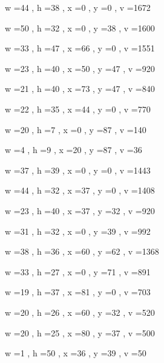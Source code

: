 \documentclass[11pt]{article}
\begin{document}
w =44 , h =38 , x =0 , y =0 , v =1672
\par
w =50 , h =32 , x =0 , y =38 , v =1600
\par
w =33 , h =47 , x =66 , y =0 , v =1551
\par
w =23 , h =40 , x =50 , y =47 , v =920
\par
w =21 , h =40 , x =73 , y =47 , v =840
\par
w =22 , h =35 , x =44 , y =0 , v =770
\par
w =20 , h =7 , x =0 , y =87 , v =140
\par
w =4 , h =9 , x =20 , y =87 , v =36
\par
\newpage




w =37 , h =39 , x =0 , y =0 , v =1443
\par
w =44 , h =32 , x =37 , y =0 , v =1408
\par
w =23 , h =40 , x =37 , y =32 , v =920
\par
w =31 , h =32 , x =0 , y =39 , v =992
\par
w =38 , h =36 , x =60 , y =62 , v =1368
\par
w =33 , h =27 , x =0 , y =71 , v =891
\par
w =19 , h =37 , x =81 , y =0 , v =703
\par
w =20 , h =26 , x =60 , y =32 , v =520
\par
w =20 , h =25 , x =80 , y =37 , v =500
\par
w =1 , h =50 , x =36 , y =39 , v =50
\par
\newpage
\end{document}
